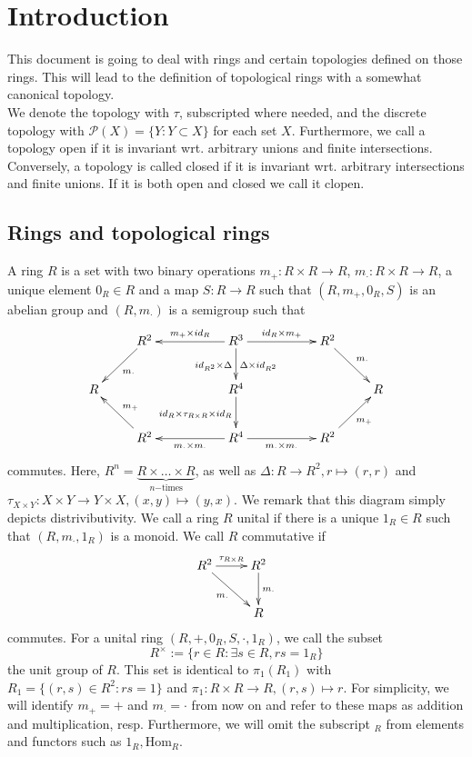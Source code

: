 \documentclass[10pt,a4paper]{article}
\author{moi}
\begin{document}
\section{Introduction}
This document is going to deal with rings and certain topologies defined on those rings. This will lead to the definition of topological rings with a somewhat canonical topology.\\
We denote the topology with $\tau$, subscripted where needed, and the discrete topology with $\mathcal{P}(X) = \{Y : Y \subset X\}$ for each set $X$. Furthermore, we call a topology open if it is invariant wrt. arbitrary unions and finite intersections. Conversely, a topology is called closed if it is invariant wrt. arbitrary intersections and finite unions. If it is both open and closed we call it clopen.
\subsection{Rings and topological rings}
A ring $R$ is a set with two binary operations $m_+ : R \times R \longrightarrow R$, $m_\cdot : R \times R \longrightarrow R$, a unique element $0_R \in R$ and a map $S : R \longrightarrow R$ such that
$(R, m_+, 0_R, S)$ is an abelian group and $(R, m_\cdot)$ is a semigroup such that
$$\xymatrix{
&R^{2}\ar[dl]^{m_\cdot}&&\ar[ll]_{\ m_+ \times id_R\ }R^{3} \ar[rr]^{id_R \times m_+}\ar[d]^{\Delta \times id_{R^{2}}}_{id_{R^2} \times \Delta}&&R^{2}\ar[dr]^{m_\cdot}\\
R&&&R^{4} \ar[d]_{id_R \times \tau_{R\times R} \times id_R}&&&R\\
&R^2 \ar[ul]_{m_+}&&R^{4} \ar[rr]_{m_\cdot \times m_\cdot}\ar[ll]^{m_\cdot \times m_\cdot} && R^{2}\ar[ur]_{m_+}\\ 
}$$
commutes. Here, $R^{n} = \underbrace{R \times \ldots \times R}_{n\mathrm{-times}}$, as well as $\Delta : R \longrightarrow R^{2}, r \longmapsto (r,r)$ and $\tau_{X\times Y} : X \times Y \longrightarrow Y \times X, (x,y) \longmapsto (y,x)$. We remark that this diagram simply depicts distrivibutivity. We call a ring $R$ unital if there is a unique $1_R \in R$ such that $(R, m_\cdot, 1_R)$ is a monoid. We call $R$ commutative if
$$\xymatrix{R^{2} \ar[r]^{\tau_{R\times R}} \ar[rd]_{m_\cdot} & R^{2}\ar[d]^{m_\cdot}\\&R\\}$$ commutes. For a unital ring $(R, +, 0_R, S, \cdot, 1_R)$, we call the subset
$$R^\times := \{r \in R : \exists s \in R, r s = 1_R\}$$
the unit group of $R$. This set is identical to $\pi_1(R_1)$ with $R_1 = \{(r,s) \in R^2 : r s = 1\}$ and $\pi_1 : R \times R \longrightarrow R, (r,s) \longmapsto r$. For simplicity, we will identify $m_+ = +$ and $m_\cdot = \cdot$ from now on and refer to these maps as addition and multiplication, resp. Furthermore, we will omit the subscript $_R$ from elements and functors such as $1_R, \mathrm{Hom}_R$.
\end{document}

